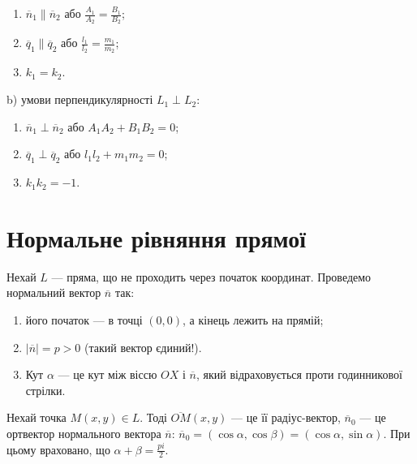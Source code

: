 \begin{enumerate}
	\item $\overline{n}_1 \parallel \overline{n}_2$ або $\frac{A_1}{A_2} = \frac{B_1}{B_2}$;
	\item $\overline{q}_1 \parallel \overline{q}_2$ або $\frac{l_1}{l_2} = \frac{m_1}{m_2}$;
	\item $k_1 = k_2$.
\end{enumerate}

b) умови перпендикулярності $L_1 \perp L_2$:

\begin{enumerate}
	\item $\overline{n}_1 \perp \overline{n}_2$ або $A_1A_2 + B_1B_2 = 0$;
	\item $\overline{q}_1 \perp \overline{q}_2$ або $l_1l_2 + m_1m_2 = 0$;
	\item $k_1k_2 = -1$.
\end{enumerate}

\section{Нормальне рівняння прямої}

Нехай $L$ --- пряма, що не проходить через початок координат. Проведемо
нормальний вектор $\overline{n}$ так:
\begin{enumerate}
	\item його початок --- в точці $(0,0)$, а кінець лежить на прямій;
	\item $|\overline{n}| = p>0$ (такий вектор єдиний!).
	\item Кут $\alpha$ --- це кут між віссю $OX$ і $\overline{n}$, який відраховується проти годинникової стрілки.
\end{enumerate}

Нехай точка $M(x,y) \in L$. Тоді $\overline{OM}(x,y)$ --- це її радіус-вектор, $\overline{n}_0$ --- це ортвектор
нормального вектора $\overline{n}$: $\overline{n}_0 = (\cos\alpha,\cos\beta) = (\cos\alpha,\sin\alpha)$. При
цьому враховано, що $\alpha + \beta = \frac{pi}{2}$.

